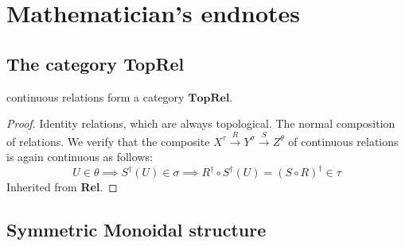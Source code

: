 \section{Mathematician's endnotes}

\subsection{The category \textbf{TopRel}}

\begin{proposition}
continuous relations form a category $\mathbf{TopRel}$.
\begin{proof}
 Identity relations, which are always topological.
 The normal composition of relations. We verify that the composite $X^\tau \overset{R}{\rightarrow} Y^\sigma \overset{S}{\rightarrow} Z^\theta$ of continuous relations is again continuous as follows:
\[U \in \theta \implies S^\dag(U) \in \sigma \implies R^\dag \circ S^\dag(U) = (S \circ R)^\dag \in \tau\]
 Inherited from \textbf{Rel}.
\end{proof}
\end{proposition}

\subsection{Symmetric Monoidal structure}


